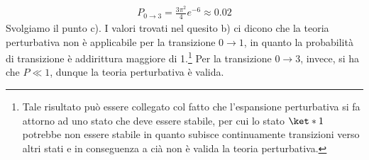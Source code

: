 \begin{soluzione}
\begin{gather*}
      P_{0 \to 3}
      =\frac{3 \pi^2}{4} e^{-6}
      \approx 0.02
   \end{gather*}
   Svolgiamo il punto c). I valori trovati nel quesito b) ci dicono che la teoria perturbativa non è applicabile per la transizione $0 \to 1$, in quanto la probabilità di transizione è addirittura maggiore di 1.\footnote{Tale risultato può essere collegato col fatto che l'espansione perturbativa si fa attorno ad uno stato che deve essere stabile, per cui lo stato $\ket*{1}$ potrebbe non essere stabile in quanto subisce continuamente transizioni verso altri stati e in conseguenza a cià non è valida la teoria perturbativa.} Per la transizione $0 \to 3$, invece, si ha che $P \ll 1$, dunque la teoria perturbativa è valida.
\end{soluzione}

\newpage
\setcounter{equation}{0}

